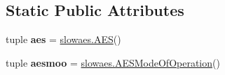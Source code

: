 \subsection*{Static Public Attributes}
\begin{DoxyCompactItemize}
\item 
\hypertarget{classsimplegui2_1_1_main_scene_a461593d8f0e6510859042c3b06ee5d68}{tuple {\bfseries aes} = \hyperlink{classslowaes_1_1_a_e_s}{slowaes.\-A\-E\-S}()}\label{classsimplegui2_1_1_main_scene_a461593d8f0e6510859042c3b06ee5d68}

\item 
\hypertarget{classsimplegui2_1_1_main_scene_ac295cbd5f6e3e052232f6490ed2a68cf}{tuple {\bfseries aesmoo} = \hyperlink{classslowaes_1_1_a_e_s_mode_of_operation}{slowaes.\-A\-E\-S\-Mode\-Of\-Operation}()}\label{classsimplegui2_1_1_main_scene_ac295cbd5f6e3e052232f6490ed2a68cf}

\end{DoxyCompactItemize}


